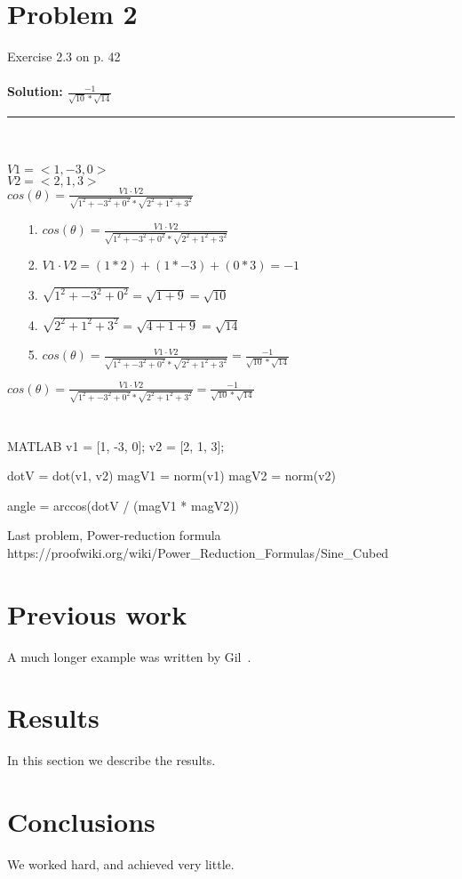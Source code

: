 \documentclass[12pt]{article}
\begin{document}
\section{Problem 2}	
Exercise 2.3 on p. 42\\ \\
\textbf{Solution: {\LARGE $ \frac{-1}{\sqrt{10} * \sqrt{14}}$ }}\\

\noindent\rule{22cm}{0.4pt}
\\ \\
$V1 = <1, -3, 0> $\\
$V2 = <2, 1, 3> $\\

{\Large$cos(\theta) = \frac{ V1 \cdot V2}{\sqrt{1^2 + -3^2 + 0^2} * \sqrt{2^2 + 1^2 + 3^2}}$ }\\

\begin{enumerate}
\item[1. ] $cos(\theta) = \frac{ V1 \cdot V2}{\sqrt{1^2 + -3^2 + 0^2} * \sqrt{2^2 + 1^2 + 3^2}}$ 
\item[2. ] $V1 \cdot V2 = (1 * 2) + (1 * -3) + (0 * 3) = -1 $
\item[3. ] $\sqrt{1^2 + -3^2 + 0^2} = \sqrt{1 + 9} = \sqrt{10} $
\item[4. ] $ \sqrt{2^2 + 1^2 + 3^2} = \sqrt{4 + 1 + 9} = \sqrt{14}$
\item[5. ] $cos(\theta) = \frac{ V1 \cdot V2}{\sqrt{1^2 + -3^2 + 0^2} * \sqrt{2^2 + 1^2 + 3^2}} = \frac{-1}{\sqrt{10} * \sqrt{14}}$  
\end{enumerate}

{\LARGE $cos(\theta) = \frac{ V1 \cdot V2}{\sqrt{1^2 + -3^2 + 0^2} * \sqrt{2^2 + 1^2 + 3^2}} = \frac{-1}{\sqrt{10} * \sqrt{14}}$ }\\
\\ \\

MATLAB
v1 = [1, -3, 0];
v2 = [2, 1, 3];

dotV = dot(v1, v2)
magV1 = norm(v1)
magV2 = norm(v2)

angle = arccos(dotV / (magV1 * magV2)) 


Last problem, Power-reduction formula
https://proofwiki.org/wiki/Power_Reduction_Formulas/Sine_Cubed

\section{Previous work}\label{previous work}
A much longer \LaTeXe{} example was written by Gil~\cite{Gil:02}.

\section{Results}\label{results}
In this section we describe the results.

\section{Conclusions}\label{conclusions}
We worked hard, and achieved very little.



\end{document}
